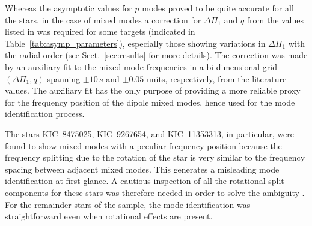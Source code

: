 \documentclass[structabstract]{aa}
\newcommand{\DP}{\Delta\Pi_1}
\begin{document}
Whereas the asymptotic values for $p$ modes proved to be quite accurate for all the stars, in the case of mixed modes a correction for $\DP$ and $q$ from the values listed in \cite{Mosser12Cat} was required for some targets (indicated in Table~\ref{tab:asymp_parameters}), especially those showing variations in $\DP$ with the radial order (see Sect.~\ref{sec:results} for more details). The correction was made by an auxiliary fit to the mixed mode frequencies in a bi-dimensional grid $\left(\DP,q \right)$ spanning $\pm 10\,s$  and $\pm 0.05$ units, respectively, from the literature values. The auxiliary fit has the only purpose of providing a more reliable proxy for the frequency position of the dipole mixed modes, hence used for the mode identification process. 

The stars KIC~8475025, KIC~9267654, and KIC~11353313, in particular, were found to show mixed modes with a peculiar frequency position because the frequency splitting due to the rotation of the star is very similar to the frequency spacing between adjacent mixed modes. This generates a misleading mode identification at first glance. A cautious inspection of all the rotational split components for these stars was therefore needed in order to solve the ambiguity \citep[e.g. see][for more discussion on mode identification in these difficult cases]{Beck14eccentric}. For the remainder stars of the sample, the mode identification was straightforward even when rotational effects are present.
\end{document}
